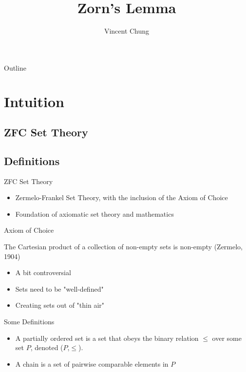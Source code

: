 \documentclass{beamer}
\title{Zorn's Lemma}
\author{Vincent Chung}
\institute[University of Hawaii at Manoa]
{
  \inst{}%
  Math 480\\
  Professor DeMeo}
\begin{document}
\begin{frame}
  \titlepage
\end{frame}

\begin{frame}{Outline}
  \tableofcontents
\end{frame}

\section{Intuition}

\subsection{ZFC Set Theory}
\subsection{Definitions}

\begin{frame}{ZFC Set Theory}
  \begin{itemize}
  \item {
    Zermelo-Frankel Set Theory, with the inclusion of the Axiom of Choice
  }
  \item {
    Foundation of axiomatic set theory and mathematics
  }
  \end{itemize}
\end{frame}

\begin{frame}{Axiom of Choice}
    \begin{theorem}
    The Cartesian product of a collection of non-empty sets is non-empty (Zermelo, 1904)
    \end{theorem}
    \begin{itemize}
        \item {
        A bit controversial
        }
        \item{
        Sets need to be "well-defined"
        }
        \item{
        Creating sets out of "thin air"}
    \end{itemize}   
\end{frame}

\begin{frame}{Some Definitions}
    \begin{itemize}
        \item {
        A partially ordered set is a set that obeys the binary relation $\leq$ over some set $P$, denoted ($P$,$\leq$).
        }
        \item{
        A chain is a set of pairwise comparable elements in $P$}
    \end{itemize}
\end{frame}
\end{document}
